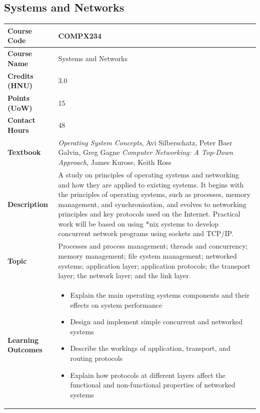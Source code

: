 \documentclass{article}
\begin{document}
\subsection[COMPX234 Systems and Networks]{Systems and Networks}
\renewcommand{\arraystretch}{1.5} %
\begin{longtable}{|p{3cm}|p{10cm}|}
\hline
\textbf{Course Code} & COMPX234 \\
\hline
\textbf{Course Name} & Systems and Networks \\
\hline
\textbf{Credits (HNU)} & 3.0 \\
\hline
\textbf{Points (UoW)} & 15 \\
\hline
\textbf{Contact Hours} & 48 \\
\hline
\textbf{Textbook} & \emph{Operating System Concepts}, Avi Silberschatz, Peter Baer Galvin, Greg Gagne\newline
                    \emph{Computer Networking: A Top-Down Approach}, James Kurose, Keith Ross\\
\hline
\textbf{Description} & 
A study on principles of operating systems and networking and how they are applied to existing systems. It begins with the principles of operating systems, such as processes, memory management, and synchronisation, and evolves to networking principles and key protocols used on the Internet. Practical work will be based on using *nix systems to develop concurrent network programs using sockets and TCP/IP.\\
\hline
\textbf{Topic} & Processes and process management; threads and concurrency; memory management; file system management; networked systems; application layer; application protocols; the transport layer; the network layer; and the link layer. \\
\hline
\textbf{Learning Outcomes} & 
    \begin{itemize}
        \item Explain the main operating systems components and their effects on system performance
        \item Design and implement simple concurrent and networked systems
        \item Describe the workings of application, transport, and routing protocols
        \item Explain how protocols at different layers affect the functional and non-functional properties of networked systems
    \end{itemize} \\
\hline
\end{longtable}
\end{document}
